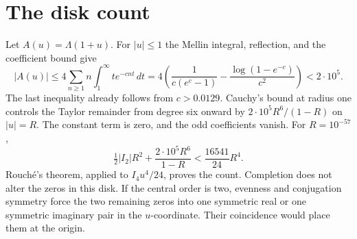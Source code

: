 \documentclass[11pt]{article}
\begin{document}
\section{The disk count}
Let \(A(u)=\Lambda(1+u)\). For \(|u|\le1\) the Mellin
integral, reflection, and the coefficient bound give
\[
 |A(u)|\le4\sum_{n\ge1}n\int_1^\infty t e^{-cnt}\,dt
 =4\left(\frac1{c(e^c-1)}
  -\frac{\log(1-e^{-c})}{c^2}\right)<2\cdot10^5 .
\]
The last inequality already follows from \(c>0.0129\).
Cauchy's bound at radius one controls the Taylor remainder from
degree six onward by \(2\cdot10^5 R^6/(1-R)\) on \(|u|=R\).
The constant term is zero, and the odd coefficients vanish.
For \(R=10^{-57}\),
\[
 \tfrac12 |I_2|R^2+\frac{2\cdot10^5 R^6}{1-R}
 <\frac{16541}{24}R^4.
\]
Rouch\'e's theorem, applied to \(I_4u^4/24\), proves the count.
Completion does not alter the zeros in this disk. If the central
order is two, evenness and conjugation symmetry force the two
remaining zeros into one symmetric real or one symmetric
imaginary pair in the \(u\)-coordinate. Their coincidence would
place them at the origin.
\end{document}

